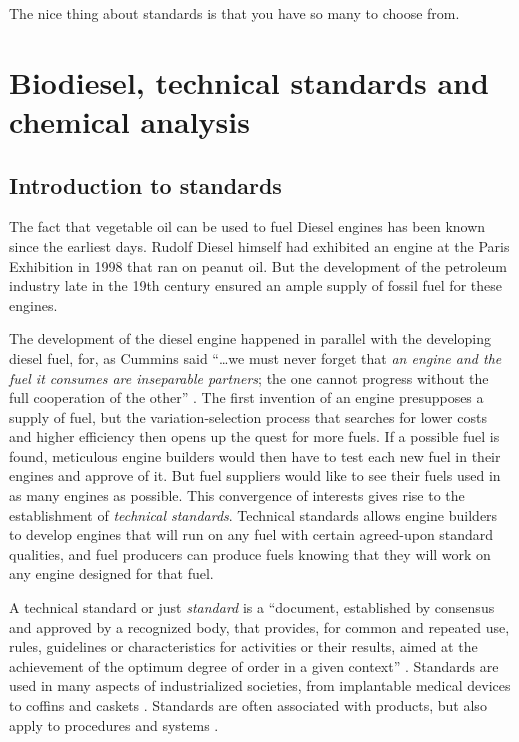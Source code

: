 
\begin{savequote}[60mm]
The nice thing about standards is that you have so many to choose from.
\end{savequote}


\chapter[Biodiesel standards]{Biodiesel, technical standards and chemical analysis} %

\label{Chapter3} %

\section{Introduction to standards}
\label{Sec:Intro}

The fact that vegetable oil can be used to fuel Diesel engines has been known
since the earliest days. Rudolf Diesel himself had exhibited an engine at the
Paris Exhibition in 1998 \autocite{Knothe2010} that ran on peanut oil. But the
development of the petroleum industry late in the 19th century ensured an ample
supply of fossil fuel for these engines.

The development of the diesel engine happened in parallel with the developing
diesel fuel, for, as Cummins said ``\ldots we must never forget that \textit{an
engine and the fuel it consumes are inseparable partners}; the one cannot
progress without the full cooperation of the other'' \autocite{Cummins1989}. The
first invention of an engine presupposes a supply of fuel, but the
variation-selection process that searches for lower costs and higher efficiency
then opens up the quest for more fuels. If a possible fuel is found, meticulous
engine builders would then have to test each new fuel in their engines and
approve of it. But fuel suppliers would like to see their fuels used in as many
engines as possible. This convergence of interests gives rise to the
establishment of \textit{technical standards}. Technical standards allows engine
builders to develop engines that will run on any fuel with certain agreed-upon
standard qualities, and fuel producers can produce fuels knowing that they will
work on any engine designed for that fuel. 

A technical standard or just \textit{standard} is a ``document, established by
consensus and approved by a recognized body, that provides, for common and
repeated use, rules, guidelines or characteristics for activities or their
results, aimed at the achievement of the optimum degree of order in a given
context'' \autocite{Hatto2010}. Standards are used in many aspects of
industrialized societies, from implantable medical devices \autocite{ISO2019} to
coffins and caskets \autocite{SABS1993}. Standards are often associated with
products, but also apply to procedures \autocite{ISO2015} and systems
\autocite{ISO2017}.

